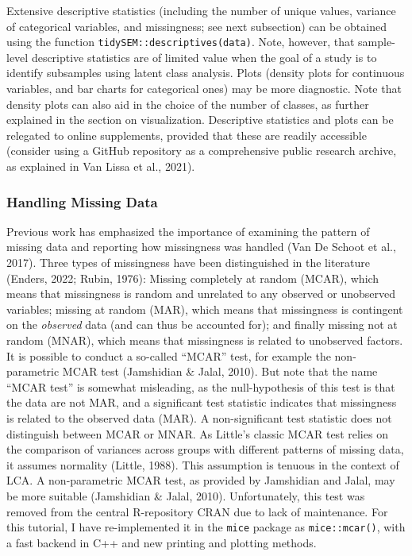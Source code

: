 \documentclass[
  ,man,floatsintext]{apa6}
\begin{document}
Extensive descriptive statistics (including the number of unique values,
variance of categorical variables, and missingness; see next subsection)
can be obtained using the function \texttt{tidySEM::descriptives(data)}. Note,
however, that sample-level descriptive statistics are of limited value
when the goal of a study is to identify subsamples using latent class
analysis. Plots (density plots for continuous variables, and bar charts
for categorical ones) may be more diagnostic. Note that density plots
can also aid in the choice of the number of classes, as further
explained in the section on visualization. Descriptive statistics and
plots can be relegated to online supplements, provided that these are
readily accessible (consider using a GitHub repository as a
comprehensive public research archive, as explained in Van Lissa et al., 2021).

\hypertarget{handling-missing-data}{%
\subsubsection{Handling Missing Data}\label{handling-missing-data}}

Previous work has emphasized the importance of examining the pattern of
missing data and reporting how missingness was handled
(Van De Schoot et al., 2017). Three types of missingness have
been distinguished in the literature (Enders, 2022; Rubin, 1976): Missing
completely at random (MCAR), which means that missingness is random and unrelated to any observed or unobserved variables;
missing at random (MAR), which means that missingness is contingent on
the \emph{observed} data (and can thus be accounted for); and finally missing
not at random (MNAR), which means that missingness is related to
unobserved factors. It is possible to conduct a so-called ``MCAR'' test,
for example the non-parametric MCAR test (Jamshidian \& Jalal, 2010). But
note that the name ``MCAR test'' is somewhat misleading, as the
null-hypothesis of this test is that the data are not MAR, and a
significant test statistic indicates that missingness is related to the
observed data (MAR). A non-significant test statistic does not
distinguish between MCAR or MNAR. As Little's classic MCAR test relies
on the comparison of variances across groups with different patterns of
missing data, it assumes normality (Little, 1988). This assumption
is tenuous in the context of LCA. A non-parametric MCAR test, as
provided by Jamshidian and Jalal, may be more suitable
(Jamshidian \& Jalal, 2010). Unfortunately, this test was removed from the
central R-repository CRAN due to lack of maintenance. For this tutorial,
I have re-implemented it in the \texttt{mice} package as \texttt{mice::mcar()}, with a
fast backend in C++ and new printing and plotting methods.
\end{document}
